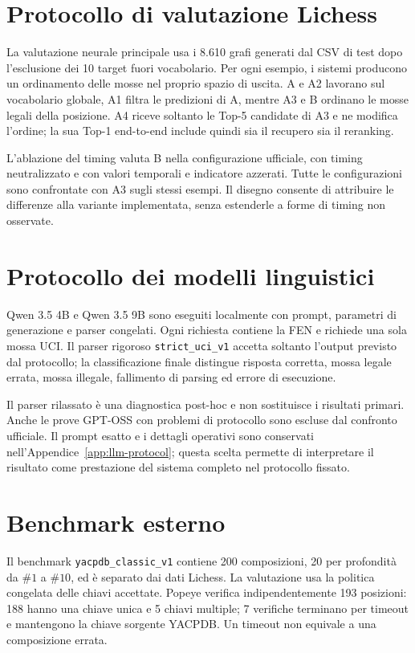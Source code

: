 \section{Protocollo di valutazione Lichess}

La valutazione neurale principale usa i 8.610 grafi generati dal CSV di test dopo
l'esclusione dei 10 target fuori vocabolario. Per ogni esempio, i sistemi producono
un ordinamento delle mosse nel proprio spazio di uscita. A e A2 lavorano sul
vocabolario globale, A1 filtra le predizioni di A, mentre A3 e B ordinano le mosse
legali della posizione. A4 riceve soltanto le Top-5 candidate di A3 e ne modifica
l'ordine; la sua Top-1 end-to-end include quindi sia il recupero sia il reranking.

L'ablazione del timing valuta B nella configurazione ufficiale, con timing
neutralizzato e con valori temporali e indicatore azzerati. Tutte le configurazioni
sono confrontate con A3 sugli stessi esempi. Il disegno consente di attribuire le
differenze alla variante implementata, senza estenderle a forme di timing non
osservate.

\section{Protocollo dei modelli linguistici}

Qwen 3.5 4B e Qwen 3.5 9B sono eseguiti localmente con prompt, parametri di
generazione e parser congelati. Ogni richiesta contiene la FEN e richiede una sola
mossa UCI. Il parser rigoroso \texttt{strict\_uci\_v1} accetta soltanto l'output
previsto dal protocollo; la classificazione finale distingue risposta corretta,
mossa legale errata, mossa illegale, fallimento di parsing ed errore di esecuzione.

Il parser rilassato è una diagnostica post-hoc e non sostituisce i risultati
primari. Anche le prove GPT-OSS con problemi di protocollo sono escluse dal
confronto ufficiale. Il prompt esatto e i dettagli operativi sono conservati
nell'Appendice~\ref{app:llm-protocol}; questa scelta permette di interpretare il
risultato come prestazione del sistema completo nel protocollo fissato.

\section{Benchmark esterno}

Il benchmark \texttt{yacpdb\_classic\_v1} contiene 200 composizioni, 20 per
profondità da \(\#1\) a \(\#10\), ed è separato dai dati Lichess. La valutazione
usa la politica congelata delle chiavi accettate. Popeye verifica indipendentemente
193 posizioni: 188 hanno una chiave unica e 5 chiavi multiple; 7 verifiche terminano
per timeout e mantengono la chiave sorgente YACPDB. Un timeout non equivale a una
composizione errata.

